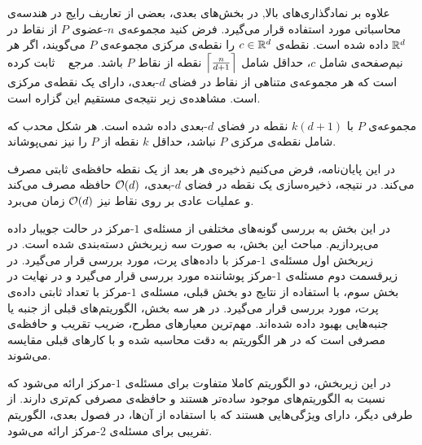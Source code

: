  

علاوه بر نمادگذاری‌های بالا, در بخش‌های بعدی، بعضی از تعاریف رایج در هندسه‌ی محاسباتی مورد استفاده قرار می‌گیرد. فرض کنید مجموعه‌ی $n$-عضوی $P$ از نقاط در $\mathbb{R}^d$ داده شده است. نقطه‌ی $c \in \mathbb{R}^d$ را نقطه‌ی مرکزی مجموعه‌ی $P$ می‌گویند، اگر هر نیم‌صفحه‌ی شامل $c$، حداقل شامل $\left\lceil{\frac{n}{d+1}}\right\rceil$ نقطه از نقاط $P$ باشد. مرجع ~ ثابت کرده است که هر مجموعه‌ی متناهی از نقاط در فضای $d$-بعدی، دارای یک نقطه‌ی مرکزی است. مشاهده‌ی زیر نتیجه‌ی مستقیم این گزاره است.


مجموعه‌ی $P$ با $k(d+1)$ نقطه در فضای $d$-بعدی داده شده است. هر شکل محدب که شامل نقطه‌ی مرکزی $P$ نباشد، حداقل $k$ نقطه‌ از $P$ را نیز نمی‌پوشاند.


در این پایان‌نامه، فرض می‌کنیم ذخیره‌ی هر بعد از یک نقطه‌ حافظه‌ی ثابتی مصرف می‌کند. در نتیجه، ذخیره‌سازی یک نقطه در فضای $d$-بعدی، $\mathcal{O}(d)$ حافظه مصرف می‌کند و عملیات عادی بر روی نقاط نیز‌ $\mathcal{O}(d)$ زمان می‌برد.


در این بخش به بررسی گونه‌های مختلفی از مسئله‌ی $1$-مرکز در حالت جویبار داده می‌پردازیم. مباحث این بخش، به صورت سه زیربخش دسته‌بندی شده است. در زیربخش اول مسئله‌ی $1$-مرکز با داده‌های پرت، مورد بررسی قرار می‌گیرد. در زیرقسمت دوم مسئله‌ی $1$-مرکز پوشاننده مورد بررسی قرار می‌گیرد و در نهایت در بخش سوم، با استفاده از نتایج دو بخش قبلی، مسئله‌ی $1$-مرکز با تعداد ثابتی داده‌ی پرت، مورد بررسی قرار می‌گیرد. در هر سه بخش‌، الگوریتم‌های قبلی از جنبه‌ یا جنبه‌هایی بهبود داده شده‌اند. مهم‌ترین معیار‌های مطرح، ضریب تقریب و حافظه‌ی مصرفی است که در هر الگوریتم به دقت محاسبه شده‌ و با کارهای قبلی مقایسه می‌شوند.


در این زیربخش، دو الگوریتم کاملا متفاوت برای مسئله‌ی $1$-مرکز‌ ارائه می‌شود که نسبت به الگوریتم‌های موجود ساده‌تر هستند و حافظه‌ی مصرفی کم‌تری دارند. از طرفی دیگر، دارای ویژگی‌هایی هستند که با استفاده از آن‌ها، در فصول بعدی، الگوریتم تفریبی برای مسئله‌ی $2$-مرکز ارائه می‌شود.

